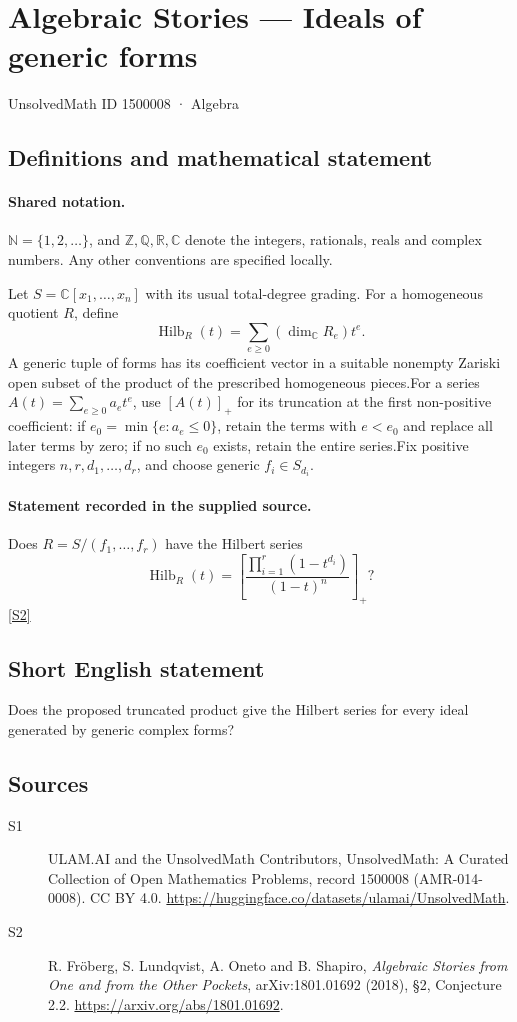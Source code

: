 \documentclass[11pt]{article}
\newcommand{\sref}[2]{\hyperlink{source:#1:#2}{[S#2]}}
\begin{document}
\setcounter{section}{1500007}
\section{Algebraic Stories — Ideals of generic forms}\label{1500008}
{\small\sffamily UnsolvedMath ID 1500008 · Algebra}
\subsection{Definitions and mathematical statement}

\paragraph{Shared notation.}$\mathbb N=\{1,2,\ldots\}$, and $\mathbb Z,\mathbb Q,\mathbb R,\mathbb C$ denote the integers, rationals, reals and complex numbers. Any other conventions are specified locally.


Let $S=\mathbb C[x_1,\ldots,x_n]$ with its usual total-degree grading. For a homogeneous quotient $R$, define
\[\operatorname{Hilb}_R(t)=\sum_{e\geq0}(\dim_{\mathbb C}R_e)t^e.
\]
A generic tuple of forms has its coefficient vector in a suitable nonempty Zariski open subset of the product of the prescribed homogeneous pieces.For a series $A(t)=\sum_{e\geq0}a_et^e$, use $[A(t)]_+$ for its truncation at the first non-positive coefficient: if $e_0=\min\{e:a_e\leq0\}$, retain the terms with $e<e_0$ and replace all later terms by zero; if no such $e_0$ exists, retain the entire series.Fix positive integers $n,r,d_1,\ldots,d_r$, and choose generic $f_i\in S_{d_i}$.
\paragraph{Statement recorded in the supplied source.}
Does $R=S/(f_1,\ldots,f_r)$ have the Hilbert series
\[\operatorname{Hilb}_R(t)=\left[\frac{\prod_{i=1}^r(1-t^{d_i})}{(1-t)^n}\right]_+?\] \sref{1500008}{2}
\subsection{Short English statement}
Does the proposed truncated product give the Hilbert series for every ideal generated by generic complex forms?
\subsection{Sources}
\begin{description}
\item[\hypertarget{source:1500008:1}{S1}] ULAM.AI and the UnsolvedMath Contributors, UnsolvedMath: A Curated Collection of Open Mathematics Problems, record 1500008 (AMR-014-0008). CC BY 4.0. \url{https://huggingface.co/datasets/ulamai/UnsolvedMath}.
\item[\hypertarget{source:1500008:2}{S2}] R. Fröberg, S. Lundqvist, A. Oneto and B. Shapiro, \emph{Algebraic Stories from One and from the Other Pockets}, arXiv:1801.01692 (2018), §2, Conjecture 2.2. \url{https://arxiv.org/abs/1801.01692}.
\end{description}
\label{end:1500008}
\end{document}
